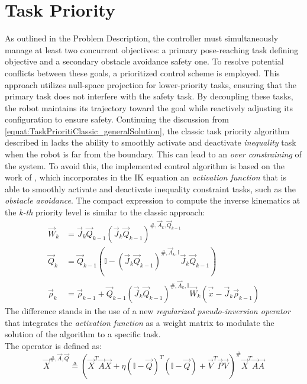 \section{Task Priority}
As outlined in the Problem Description, the controller must simultaneously manage at least two concurrent objectives: a primary pose-reaching task defining objective and a secondary obstacle avoidance safety one. To resolve potential conflicts between these goals, a prioritized control scheme is employed. This approach utilizes null-space projection for lower-priority tasks, ensuring that the primary task does not interfere with the safety task. By decoupling these tasks, the robot maintains its trajectory toward the goal while reactively adjusting its configuration to ensure safety.
Continuing the discussion from \ref{equat:TaskPrioritiClassic_generalSolution}, the classic task priority algorithm described in \cite{slotine1991general} lacks the ability to smoothly activate and deactivate \textit{inequality} task when the robot is far from the boundary. This can lead to an \textit{over constraining} of the system. To avoid this, the implemented control algorithm is based on the work of \cite{simetti2016novel}, which incorporates in the IK equation an \textit{activation function} that is able to smoothly activate and deactivate inequality constraint tasks, such as the \textit{obstacle avoidance}.
The compact expression to compute the inverse kinematics at the \textit{k-th} priority level is similar to the classic approach:
\begin{equation}
	\begin{aligned}
		\vec{W}_k &= \vec{J}_k\vec{Q}_{k-1}(\vec{J}_k\vec{Q}_{k-1})^{\#,\vec{A}_k,\vec{Q}_{k-1}} \\
		\vec{Q}_k &= \vec{Q}_{k-1}(\mathbb{I}-(\vec{J}_k\vec{Q}_{k-1})^{\#,\vec{A}_k,\mathbb{I}}\vec{J}_k\vec{Q}_{k-1}) \\
		\vec{\rho}_k &= \vec{\rho}_{k-1} + \vec{Q}_{k-1}(\vec{J}_k\vec{Q}_{k-1})^{\#,\vec{A}_k,\mathbb{I}}\vec{W}_k(\vec{\dot{x}}-\vec{J}_k\vec{\rho}_{k-1})
	\end{aligned}
	\label{equat:Modern_TP_algorithm}
\end{equation}
\noindent The difference stands in the use of a new \textit{regularized pseudo-inversion operator} that integrates the \textit{activation function} as a weight matrix to modulate the solution of the algorithm to a specific task.\\
\noindent The operator is defined as:
\begin{equation}
	\vec{X}^{\#,\vec{A},\vec{Q}} \triangleq (\vec{X}^T\vec{A}\vec{X} + \eta(\mathbb{I}-\vec{Q})^T(\mathbb{I}-\vec{Q}) + \vec{V}^T\vec{P}\vec{V})^{\#} \vec{X}^T\vec{A}\vec{A}
	\label{equat:RegPseudoInverse_operator}
\end{equation}
